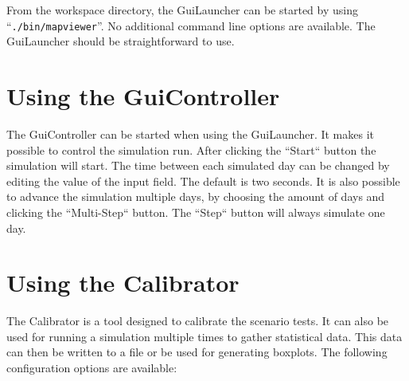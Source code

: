 From the workspace directory, the GuiLauncher can be started by using \mbox{``\texttt{./bin/mapviewer}''}. No additional command line options are available.
The GuiLauncher should be straightforward to use.

\section{Using the GuiController}
\label{sec:guicontroller}

The GuiController can be started when using the GuiLauncher. It makes it possible to control the simulation run.
After clicking the ``Start`` button the simulation will start. The time between each simulated day can be changed by editing the value of the input field. The default is two seconds.
It is also possible to advance the simulation multiple days, by choosing the amount of days and clicking the ``Multi-Step`` button.
The ``Step`` button will always simulate one day.

\section{Using the Calibrator}
\label{sec:calibrator}

The Calibrator is a tool designed to calibrate the scenario tests.
It can also be used for running a simulation multiple times to gather statistical data.
This data can then be written to a file or be used for generating boxplots.
The following configuration options are available:

